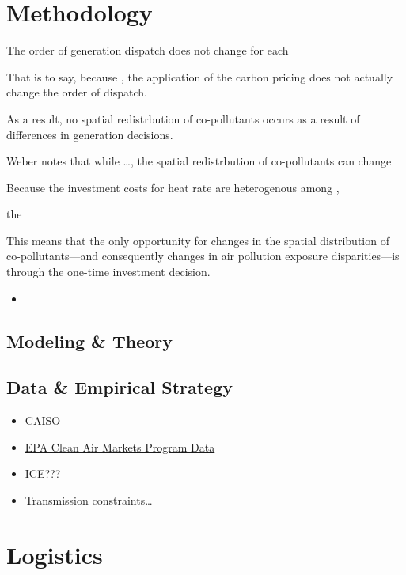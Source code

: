\documentclass[11pt]{article}
\begin{document}
\section*{Methodology}

The order of generation dispatch does not change for each

That is to say, because , the application of the carbon pricing does not actually change the order of dispatch. 

As a result, no spatial redistrbution of co-pollutants occurs as a result of differences in generation decisions. 

Weber notes that while \ldots, the spatial redistrbution of co-pollutants can change 

Because the investment costs for heat rate are heterogenous among , 

the 

This means that the only opportunity for changes in the spatial distribution of co-pollutants---and consequently changes in air pollution exposure disparities---is through the one-time investment decision.  

\begin{itemize}
	\item \cite{fowlie2009incomplete}
\end{itemize}

\subsection*{Modeling \& Theory}



\subsection*{Data \& Empirical Strategy}

\begin{itemize}
	\item \href{http://oasis.caiso.com/mrioasis/logon.do}{CAISO}
	\item \href{https://campd.epa.gov/data/bulk-data-files}{EPA Clean Air Markets Program Data}
	\item ICE???
	\item Transmission constraints\ldots
\end{itemize}



\section*{Logistics}
\end{document}
